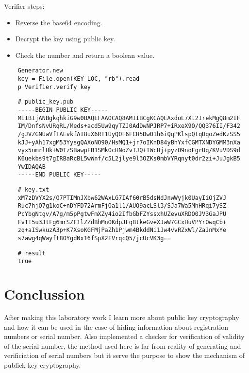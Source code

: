 \documentclass{article}
\begin{document}
    Verifier steps:

    \begin{itemize}
      \item Reverse the base64 encoding.
      \item Decrypt the key using public key.
      \item Check the number and return a boolean value.
    \end{itemize}

    \begin{lstlisting}
    Generator.new
    key = File.open(KEY_LOC, "rb").read
    p Verifier.verify key 
    \end{lstlisting}

    \begin{lstlisting}
    # public_key.pub
    -----BEGIN PUBLIC KEY-----
    MIIBIjANBgkqhkiG9w0BAQEFAAOCAQ8AMIIBCgKCAQEAxdoL7Xt2IrekMgQ8m2IF
    IM/DnfsNvURqRL/Meds+acd5Uw9qyTZJ0AdDwNPJRP7+iRxeX9O/QQ376II/F342
    /gJVZGNUaVfTAEvkfAI8uX6RT1UyQOF6FCH5DwO1h6iQqPKlspQtqDqoZedKzSS5
    kJJ+yAh17xgM53YysgQAXoNO90/HsMQ1+jr7oIKnD84yBhYxfCGMTXNDYGMM3nXa
    vyx5nmrlHk+W0TzSBawpFB1SMkOcHNoZvTJQ+TWcHj+pyzO9noFgrUq/KVuVDS9d
    K6uekbs9t7gIRBaRcBL5wWnf/c5L2jlye9l3OZKs0mbVYRqnyt0dr2zi+JuJgkB5
    YwIDAQAB
    -----END PUBLIC KEY-----
    \end{lstlisting}

    \begin{lstlisting}
    # key.txt
    xM7zDVYX2s/O7PTIMnJXbw62WAxLG7IAf60rB5dsNdJnwWyjk0UayIiOjZVJ
    Ruc7hjO7g1koC+nDYFD72ArmFjOa1l1/AUQ9acLSl3/SJa7Wa5MhHRqi7ySZ
    PcYbgNtgv/A7g/m5pPgtwFmXZy4io2IfbGbFZYssxhUZevuXRDO0JV3GaJPU
    FvTI5u3JtFg6mrSZF1lZZdBhMnOKdpJFqBtkeGveXJaW7GCxHuVPYrOwqCb+
    zq+aISwkuzA3p+K7XsoKGFMjPaZh1Pjwm4BkddNi1Jw4vvRZxWl/ZaJnMxYe
    s7awg4qWayft8OYgdNx16fSpX2FVrqcQ5/jcUcVK3g==
    \end{lstlisting}

    \begin{lstlisting}
    # result 
    true
    \end{lstlisting}

 \section{Conclussion}

    After making this laboratory work I learn more about public key cryptography and how
    it can be used in the case of hiding information about registration numbers or 
    serial number. Also implemented a checker for verification of validity of the serial number, 
    the method used here is far from reality of generating and verificiation of serial numbers 
    but it serve the purpose to show the mechanism of publick key cryptography. 
\end{document}
